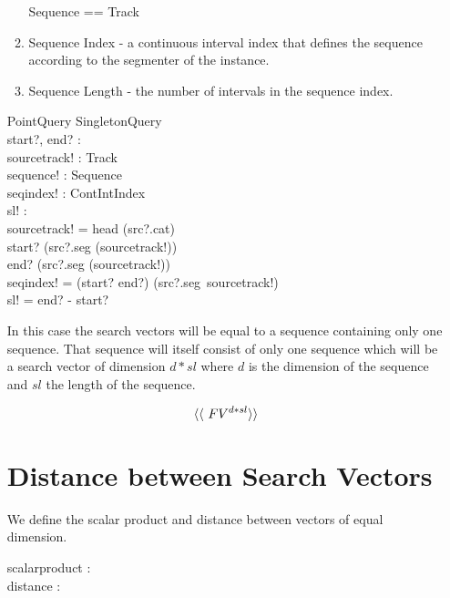 \documentclass[11pt]{article}
\begin{document}
\begin{enumerate}
\begin{enumerate}
\begin{zed}
	Sequence == Track
\end{zed}

\item \textsf{Sequence Index} - a continuous interval index that defines the sequence according to the segmenter of the instance. 


\item \textsf{Sequence Length} - the number of  intervals in the sequence index.

\end{enumerate}

\begin{schema}{PointQuery}
	SingletonQuery \\
	start?, end? :  \nat \\
	sourcetrack! : Track \\
	sequence! : Sequence \\
      	seqindex! : ContIntIndex \\
	sl! : \nat \\
\where
	sourcetrack! = head (src?.cat)  \\
	start? \in \dom (src?.seg (sourcetrack!)) \\ 
	end? \in \dom (src?.seg (sourcetrack!)) \\ 
	seqindex! =  (start? \upto end?) \dres (src?.seg~sourcetrack!)   \\
	sl! = end? - start? \\
\end{schema}

In this case the search vectors will be equal to a sequence containing only one sequence. That sequence will itself consist of only one sequence which will be a search vector of dimension $d * sl$ where $d$ is the dimension of the sequence and $sl$ the length of the sequence. 

\[  \langle \langle \mathrel{~FV^{d * sl}} \rangle \rangle \]

\section{Distance between Search Vectors}	

We define the scalar product and distance between vectors of equal dimension. 

\begin{axdef}
	scalarproduct : \V \fun \V \fun \R \\
	distance : \V \fun \V \fun \R \\
\end{axdef}


\end{enumerate}
\end{document}
